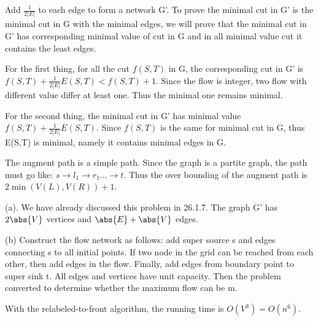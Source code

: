\begin{psproblem}[26.2.13]
\end{psproblem}
\begin{pssolution}
    Add $\frac{1}{2|E|}$ to each edge to form a network G'. To prove the minimal cut in G' is the minimal cut in G with the minimal edges, we will prove that the minimal cut in G' has corresponding minimal value of cut in G and in all minimal value cut it contains the least edges.

    For the first thing, for all the cut $f(S,T)$ in G, the corresponding cut in G' is $f(S,T)+\frac{1}{2|E|}E(S,T)<f(S,T)+1$. Since the flow is integer, two flow with different value differ at least one. Thus the minimal one remains minimal.

    For the second thing, the minimal cut in G' has minimal value $f(S,T)+\frac{1}{2|E|}E(S,T)$. Since $f(S,T)$ is the same for minimal cut in G, thus E(S,T) is minimal, namely it contains minimal edges in G.
\end{pssolution}

\begin{psproblem}[26.3.3]
\end{psproblem}
\begin{pssolution}
    The augment path is a simple path. Since the graph is a partite graph, the path must go like: $s\rightarrow l_1\rightarrow r_1\dots \rightarrow t$. Thus the over bounding of the augment path is $2\min{(V(L),V(R))}+1$.
\end{pssolution}

\begin{psproblem}[26-1]
\end{psproblem}
\begin{pssolution}
    (a). We have already discussed this problem in 26.1.7. The graph G' has $2\abs{V}$ vertices and $\abs{E}+\abs{V}$ edges.

    (b) Construct the flow network as follows: add super source s and edges connecting s to all initial points. If two node in the grid can be reached from each other, then add edges in the flow. Finally, add edges from boundary point to super sink t. All edges and vertices have unit capacity. Then the problem converted to determine whether the maximum flow can be m.
    
    With the relabeled-to-front algorithm, the running time is $O(V^3)=O(n^6)$.
\end{pssolution}

